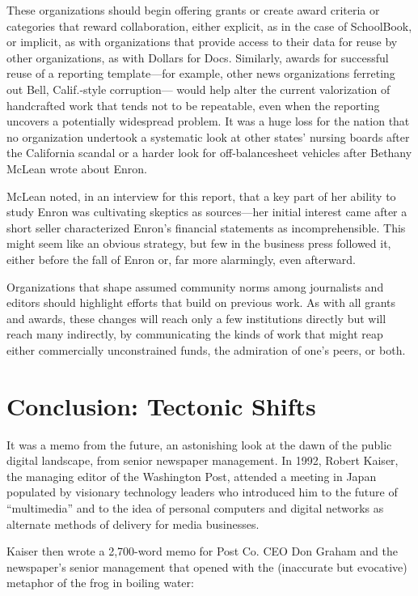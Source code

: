 These organizations should begin offering grants or create award criteria
or categories that reward collaboration, either explicit, as in the case
of SchoolBook, or implicit, as with organizations that provide access
to their data for reuse by other organizations, as with Dollars for Docs.
Similarly, awards for successful reuse of a reporting template—for example,
other news organizations ferreting out Bell, Calif.-style corruption—
would help alter the current valorization of handcrafted work
that tends not to be repeatable, even when the reporting uncovers a
potentially widespread problem. It was a huge loss for the nation that
no organization undertook a systematic look at other states’ nursing
boards after the California scandal or a harder look for off-balancesheet
vehicles after Bethany McLean wrote about Enron.

McLean noted, in an interview for this report, that a key part of her
ability to study Enron was cultivating skeptics as sources—her initial interest
came after a short seller characterized Enron’s financial statements
as incomprehensible. This might seem like an obvious strategy, but few
in the business press followed it, either before the fall of Enron or, far
more alarmingly, even afterward.

Organizations that shape assumed community norms among journalists
and editors should highlight efforts that build on previous work.
As with all grants and awards, these changes will reach only a few institutions
directly but will reach many indirectly, by communicating
the kinds of work that might reap either commercially unconstrained
funds, the admiration of one’s peers, or both.


\chapter{Conclusion: Tectonic Shifts}

It was a memo from the future, an astonishing look at the dawn of the public
digital landscape, from senior newspaper management. In 1992, Robert Kaiser,
the managing editor of the Washington Post, attended a meeting in Japan populated
by visionary technology leaders who introduced him to the future of ``multimedia''
and to the idea of personal computers and digital networks as alternate
methods of delivery for media businesses.

Kaiser then wrote a 2,700-word memo for Post Co. CEO Don Graham and the
newspaper’s senior management that opened with the (inaccurate but evocative)
metaphor of the frog in boiling water:

